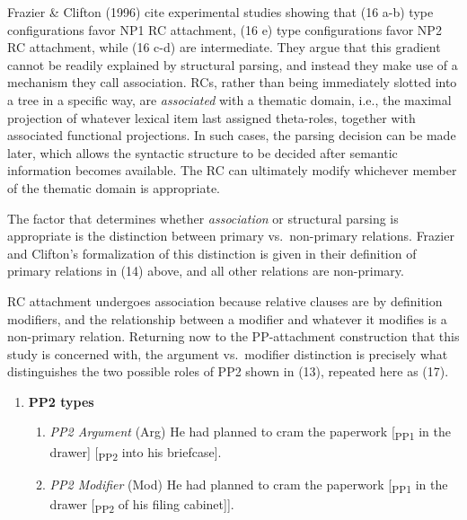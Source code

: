 \documentclass[11pt,oneside]{book}
\providecommand{\tightlist}{%
  \setlength{\itemsep}{0pt}\setlength{\parskip}{0pt}}
\begin{document}
Frazier \& Clifton (1996) cite experimental studies showing that (16 a-b) type configurations favor NP1 RC attachment, (16 e) type configurations favor NP2 RC attachment, while (16 c-d) are intermediate. They argue that this gradient cannot be readily explained by structural parsing, and instead they make use of a mechanism they call association. RCs, rather than being immediately slotted into a tree in a specific way, are \emph{associated} with a thematic domain, i.e., the maximal projection of whatever lexical item last assigned theta-roles, together with associated functional projections. In such cases, the parsing decision can be made later, which allows the syntactic structure to be decided after semantic information becomes available. The RC can ultimately modify whichever member of the thematic domain is appropriate.

The factor that determines whether \emph{association} or structural parsing is appropriate is the distinction between primary vs.~non-primary relations. Frazier and Clifton's formalization of this distinction is given in their definition of primary relations in (14) above, and all other relations are non-primary.

RC attachment undergoes association because relative clauses are by definition modifiers, and the relationship between a modifier and whatever it modifies is a non-primary relation. Returning now to the PP-attachment construction that this study is concerned with, the argument vs.~modifier distinction is precisely what distinguishes the two possible roles of PP2 shown in (13), repeated here as (17).

\begin{enumerate}
\def\labelenumi{(\arabic{enumi})}
\setcounter{enumi}{16}
\tightlist
\item
  \textbf{PP2 types}

  \begin{enumerate}
  \def\labelenumii{(\alph{enumii})}
  \tightlist
  \item
    \emph{PP2 Argument} (Arg)
    He had planned to cram the paperwork {[}\textsubscript{PP1} in the drawer{]} {[}\textsubscript{PP2} into his briefcase{]}.
  \item
    \emph{PP2 Modifier} (Mod)
    He had planned to cram the paperwork {[}\textsubscript{PP1} in the drawer {[}\textsubscript{PP2} of his filing cabinet{]}{]}.
  \end{enumerate}
\end{enumerate}
\end{document}
